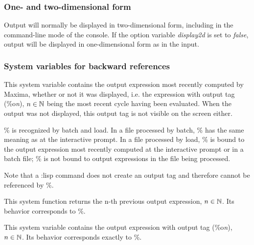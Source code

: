 \documentclass[../Maxima_Workbook.tex]{subfiles}
\begin{document}
\subsubsection{One- and two-dimensional form}

\lz {} \qquad {} \hfill \tcr{[variable]}\index{\%}

\lz Output will normally be displayed in two-dimensional form, including in the command-line mode of the console. If the option variable \emph{display2d} is set to \emph{false}, output will be displayed in one-dimensional form as in the input.

\subsubsection{System variables for backward references}

\lz \hyt{\%}{\tcr{\emph{\%}}} \hfill \tcr{[variable]}\index{\%}

\lz This system variable contains the output expression most recently computed by Maxima, whether or not it was displayed, i.e. the expression with output tag (\%o\emph{n}), $ n \in \mathbb{N} $ being the most recent cycle having been evaluated. When the output was not displayed, this output tag is not visible on the screen either. 

\lz \% is recognized by batch and load. In a file processed by batch, \% has the same meaning as at the interactive prompt. In a file processed by load, \% is bound to the output expression most recently computed at the interactive prompt or in a batch file; \% is not bound to output expressions in the file being processed.

\lz Note that a :lisp command does not create an output tag and therefore cannot be referenced by \%.

\lzz {} \hfill \tcr{[function]}

\lz This system function returns the n-th previous output expression, $ n \in \mathbb{N} $. Its behavior corresponds to \%.

\lzz {} \hfill \tcr{[variable]}

\lz This system variable contains the output expression with output tag (\%o\emph{n}), $ n \in \mathbb{N} $. Its behavior corresponds exactly to \%.

\lzz \hyt{\%\%}{\tcr{\emph{\%\%}}} \hfill \tcr{[variable]}\index{\%\%}
\end{document}
